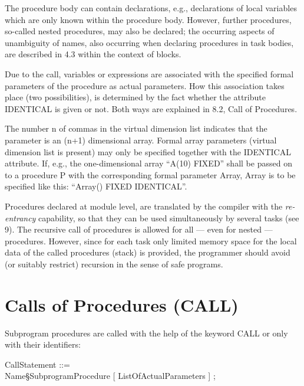 The procedure body can contain declarations, e.g., declarations of local
variables which are only known within the procedure body. However,
further procedures, so-called nested procedures, may also be declared; the
occurring aspects of unambiguity of names, also occurring when declaring
procedures in task bodies, are described in 4.3 within the context of
blocks.

Due to the call, variables or expressions are associated with the
specified formal parameters of the procedure as actual parameters. How
this association takes place (two possibilities), is determined by the
fact whether the attribute IDENTICAL is given or not. Both ways are
explained in 8.2, Call of Procedures.

The number n of commas in the virtual dimension list indicates that the
parameter is an (n+1) dimensional array. Formal array parameters
(virtual dimension list is present) may only be specified together with
the IDENTICAL attribute. If, e.g., the one-dimensional array ``A(10)
FIXED'' shall be passed on to a procedure P with the corresponding
formal parameter Array, Array is to be specified like this: ``Array()
FIXED IDENTICAL''.

Procedures declared at module level, are translated by the compiler with
the {\em re-entrancy} capability, so that they can be used
simultaneously by several tasks (see 9). The recursive call of
procedures is allowed for all --- even for nested --- procedures.
However, since for each task only limited memory space for the local
data of the called procedures (stack) is provided, the programmer
should avoid (or suitably restrict) recursion in the sense of safe
programs.

\section{Calls of Procedures (CALL)}   %

Subprogram procedures are called with the help of the keyword CALL or
only with their identifiers:

\begin{front}
CallStatement ::=\\
\x [ {\bf CALL} ] Name\S SubprogramProcedure [ ListOfActualParameters ] ;
\end{front}
\begin{grammar}

\end{grammar}



